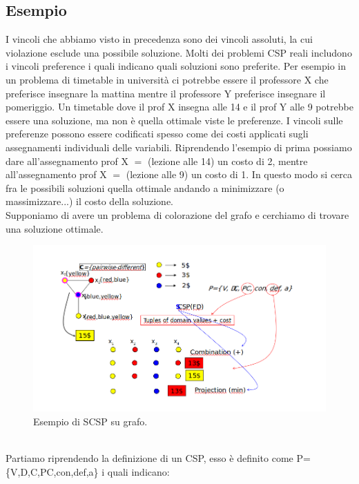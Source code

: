 \subsection{Esempio}
I vincoli che abbiamo visto in precedenza sono dei vincoli assoluti, la cui violazione esclude una possibile soluzione. Molti dei problemi CSP reali includono i vincoli preference i quali indicano quali soluzioni sono preferite. Per esempio in un problema di timetable in università ci potrebbe essere il professore X che preferisce insegnare la mattina mentre il professore Y preferisce insegnare il pomeriggio. Un timetable dove il prof X insegna alle 14 e il prof Y alle 9 potrebbe essere una soluzione, ma non è quella ottimale viste le preferenze. I vincoli sulle preferenze possono essere codificati spesso come dei costi applicati sugli assegnamenti individuali delle variabili. Riprendendo l’esempio di prima possiamo dare all’assegnamento prof X $=$ (lezione alle 14) un costo di 2, mentre all’assegnamento prof X $=$ (lezione alle 9) un costo di 1. In questo modo si cerca fra le possibili soluzioni quella ottimale andando a minimizzare (o massimizzare...) il costo della soluzione.
\\Supponiamo di avere un problema di colorazione del grafo e cerchiamo di trovare una
soluzione ottimale.
\begin{figure}[htp]
	\centering
    \includegraphics[width=14cm, keepaspectratio]{img/Cap4/scsp2.png}
    \caption{Esempio di SCSP su grafo.}
\end{figure}
\\Partiamo riprendendo la definizione di un CSP, esso è definito come P=\{V,D,C,PC,con,def,a\} i quali indicano:
